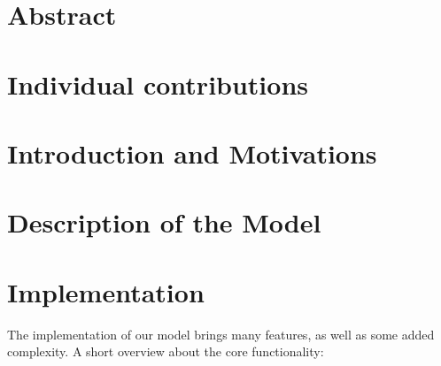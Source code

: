 \documentclass[11pt]{article}
\begin{document}
\section{Abstract}

\section{Individual contributions}

\section{Introduction and Motivations}

\section{Description of the Model}

\section{Implementation}

The implementation of our model brings many features, as well as some added complexity.\newline
A short overview about the core functionality:\newline
\end{document}
